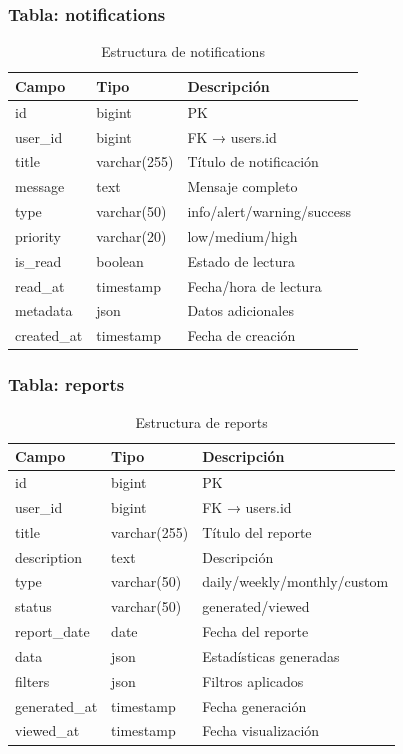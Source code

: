 \subsubsection{Tabla: notifications}

\begin{table}[H]
\centering
\small
\begin{tabular}{|l|l|p{5cm}|}
\hline
\textbf{Campo} & \textbf{Tipo} & \textbf{Descripción} \\
\hline
id & bigint & PK \\
user\_id & bigint & FK → users.id \\
title & varchar(255) & Título de notificación \\
message & text & Mensaje completo \\
type & varchar(50) & info/alert/warning/success \\
priority & varchar(20) & low/medium/high \\
is\_read & boolean & Estado de lectura \\
read\_at & timestamp & Fecha/hora de lectura \\
metadata & json & Datos adicionales \\
created\_at & timestamp & Fecha de creación \\
\hline
\end{tabular}
\caption{Estructura de notifications}
\end{table}

\subsubsection{Tabla: reports}

\begin{table}[H]
\centering
\small
\begin{tabular}{|l|l|p{5cm}|}
\hline
\textbf{Campo} & \textbf{Tipo} & \textbf{Descripción} \\
\hline
id & bigint & PK \\
user\_id & bigint & FK → users.id \\
title & varchar(255) & Título del reporte \\
description & text & Descripción \\
type & varchar(50) & daily/weekly/monthly/custom \\
status & varchar(50) & generated/viewed \\
report\_date & date & Fecha del reporte \\
data & json & Estadísticas generadas \\
filters & json & Filtros aplicados \\
generated\_at &  timestamp & Fecha generación \\
viewed\_at & timestamp & Fecha visualización \\
\hline
\end{tabular}
\caption{Estructura de reports}
\end{table}

